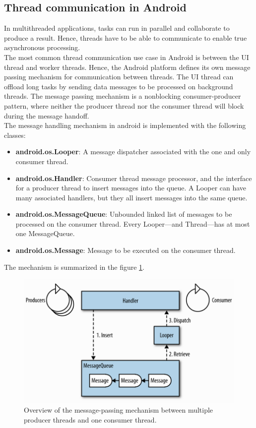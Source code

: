 \subsection{ Thread communication in Android}
In multithreaded applications, tasks can run in parallel and collaborate to produce a result. Hence, threads have to be able to communicate to enable true asynchronous processing.\\
The most common thread communication use case in Android is between the UI thread and worker threads. Hence, the Android platform defines its own message passing mechanism for communication between threads. The UI thread can offload long tasks by sending data messages to be processed on background threads. The message passing mechanism is a nonblocking consumer-producer pattern, where neither the producer thread nor the consumer thread will block during the message handoff.\\
The message handling mechanism in android is implemented with the following classes:
\begin{itemize}
	\item \textbf{android.os.Looper}: A message dispatcher associated with the one and only consumer thread.
	\item \textbf{android.os.Handler}: Consumer thread message processor, and the interface for a producer thread to insert messages into the queue. A Looper can have many associated handlers, but they all insert messages into the same queue.
	\item \textbf{android.os.MessageQueue}: Unbounded linked list of messages to be processed on the consumer thread. Every Looper—and Thread—has at most one MessageQueue.
	\item \textbf{android.os.Message}: Message to be executed on the consumer thread.
\end{itemize}
	The mechanism is summarized in the figure \ref{fig7.2}.
\begin{figure}[ht!]
	\centering
	\includegraphics[width=120mm]{figures/ch7/2.png}
	\caption{Overview of the message-passing mechanism between multiple producer threads and one consumer thread.}
	\label{fig7.2}
\end{figure}
